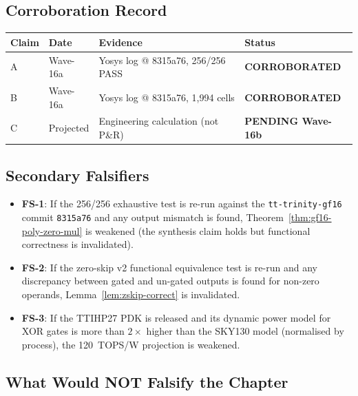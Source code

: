 \subsection{Corroboration Record}

\begin{center}
\begin{tabular}{llll}
\toprule
\textbf{Claim} & \textbf{Date} & \textbf{Evidence} & \textbf{Status} \\
\midrule
A & Wave-16a & Yosys log @ 8315a76, 256/256 PASS & \textbf{CORROBORATED} \\
B & Wave-16a & Yosys log @ 8315a76, 1,994 cells & \textbf{CORROBORATED} \\
C & Projected & Engineering calculation (not P\&R) & \textbf{PENDING Wave-16b} \\
\bottomrule
\end{tabular}
\end{center}

\subsection{Secondary Falsifiers}

\begin{itemize}
  \item \textbf{FS-1}: If the 256/256 exhaustive test is re-run against
        the \texttt{tt-trinity-gf16} commit \texttt{8315a76} and any output
        mismatch is found, Theorem~\ref{thm:gf16-poly-zero-mul} is weakened
        (the synthesis claim holds but functional correctness is invalidated).
  \item \textbf{FS-2}: If the zero-skip v2 functional equivalence test is
        re-run and any discrepancy between gated and un-gated outputs is found
        for non-zero operands, Lemma~\ref{lem:zskip-correct} is invalidated.
  \item \textbf{FS-3}: If the TTIHP27 PDK is released and its dynamic power
        model for XOR gates is more than \(2\times\) higher than the SKY130
        model (normalised by process), the 120~TOPS/W projection is weakened.
\end{itemize}

\subsection{What Would NOT Falsify the Chapter}

